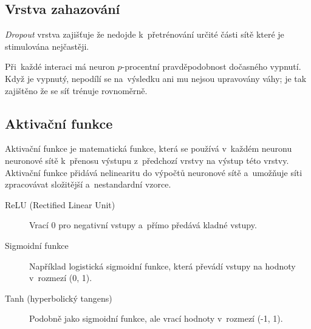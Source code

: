 \subsection{Vrstva zahazování}

\emph{Dropout} vrstva zajišťuje že nedojde k~přetrénování určité části sítě které je stimulována nejčastěji.

Při~každé interaci má neuron $p$-procentní pravděpodobnost dočasného vypnutí.
Když je vypnutý, nepodílí se na~výsledku ani mu nejsou upravovány váhy; je tak zajištěno že se síť trénuje rovnoměrně.

\subsection{Aktivační funkce}

Aktivační funkce je matematická funkce, která se používá v~každém neuronu neuronové sítě k~přenosu výstupu z~předchozí vrstvy na výstup této vrstvy. Aktivační funkce přidává nelinearitu do výpočtů neuronové sítě a~umožňuje síti zpracovávat složitější a~nestandardní vzorce.

\begin{description}
    \item[ReLU (Rectified Linear Unit)] Vrací 0 pro negativní vstupy a~přímo předává kladné vstupy.
    \item[Sigmoidní funkce] Například logistická sigmoidní funkce, která převádí vstupy na hodnoty v~rozmezí (0, 1).
    \item[Tanh (hyperbolický tangens)] Podobně jako sigmoidní funkce, ale vrací hodnoty v~rozmezí (-1, 1).
\end{description}

